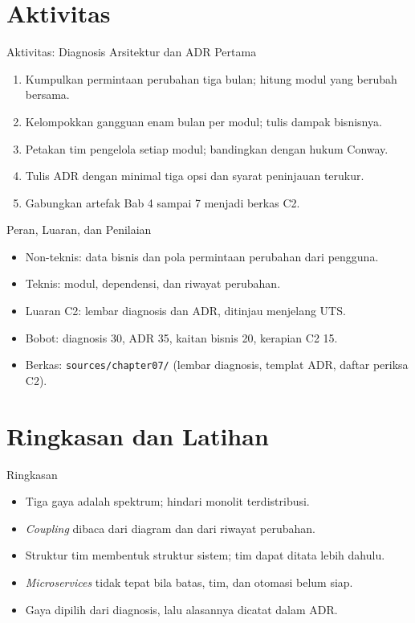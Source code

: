 \documentclass[aspectratio=169, table, 12pt]{beamer}
\begin{document}
\section{Aktivitas}

\begin{frame}{{\Large Aktivitas: Diagnosis Arsitektur dan ADR Pertama}}
  \vspace{6pt}
  \small
  \begin{enumerate}
    \item Kumpulkan permintaan perubahan tiga bulan; hitung modul yang berubah bersama.
    \item Kelompokkan gangguan enam bulan per modul; tulis dampak bisnisnya.
    \item Petakan tim pengelola setiap modul; bandingkan dengan hukum Conway.
    \item Tulis ADR dengan minimal tiga opsi dan syarat peninjauan terukur.
    \item Gabungkan artefak Bab 4 sampai 7 menjadi berkas C2.
  \end{enumerate}
\end{frame}

\begin{frame}{{\Large Peran, Luaran, dan Penilaian}}
  \vspace{6pt}
  \begin{itemize}
    \item Non-teknis: data bisnis dan pola permintaan perubahan dari pengguna.
    \item Teknis: modul, dependensi, dan riwayat perubahan.
    \item Luaran C2: lembar diagnosis dan ADR, ditinjau menjelang UTS.
    \item Bobot: diagnosis 30, ADR 35, kaitan bisnis 20, kerapian C2 15.
    \item Berkas: \texttt{sources/chapter07/} (lembar diagnosis, templat ADR, daftar periksa C2).
  \end{itemize}
\end{frame}

\section{Ringkasan dan Latihan}

\begin{frame}{{\Large Ringkasan}}
  \vspace{6pt}
  \begin{itemize}
    \item Tiga gaya adalah spektrum; hindari monolit terdistribusi.
    \item \textit{Coupling} dibaca dari diagram dan dari riwayat perubahan.
    \item Struktur tim membentuk struktur sistem; tim dapat ditata lebih dahulu.
    \item \textit{Microservices} tidak tepat bila batas, tim, dan otomasi belum siap.
    \item Gaya dipilih dari diagnosis, lalu alasannya dicatat dalam ADR.
  \end{itemize}
\end{frame}
\end{document}
